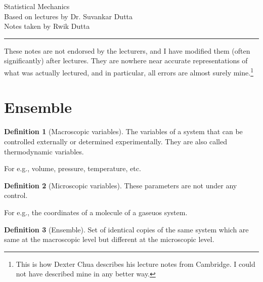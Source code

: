 \documentclass[10pt, a4paper]{extarticle}
\theoremstyle{definition}
\newtheorem{defn}{Definition}
\begin{document}
\begin{center}
	\fontsize{25}{60}\selectfont Statistical Mechanics \\
	\large Based on lectures by Dr. Suvankar Dutta\\
	Notes taken by Rwik Dutta
\end{center}
\hrule
\begin{center}
	These notes are not endorsed by the lecturers, and I have modified them (often
	significantly) after lectures. They are nowhere near accurate representations of what
	was actually lectured, and in particular, all errors are almost surely mine.\footnote[1]{This is how Dexter Chua describes his lecture notes from Cambridge. I could not have described mine in any better way.}
\end{center}
\tableofcontents

\newpage

\section{Ensemble}
\begin{defn}[Macroscopic variables]
	The variables of a system that can be controlled externally or determined experimentally. They are also called thermodynamic variables.

	For e.g., volume, pressure, temperature, etc.
\end{defn}
\begin{defn}[Microscopic variables]
	These parameters are not under any control.

	For e.g., the coordinates of a molecule of a gaseuos system.
\end{defn}
\begin{defn}[Ensemble]
	Set of identical copies of the same system which are same at the macroscopic level but different at the microscopic level.
\end{defn}
\end{document}
